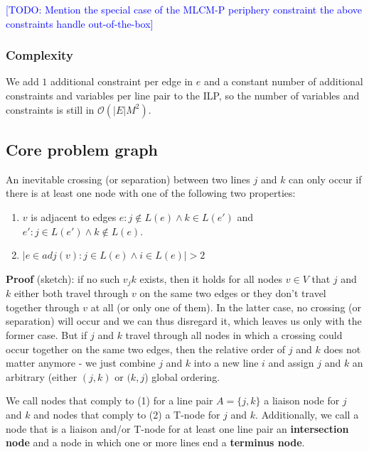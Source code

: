 \documentclass{llncs}
\newcommand\todo[1]{\textcolor{blue}{[TODO: #1]}}
\begin{document}
\todo{Mention the special case of the MLCM-P periphery constraint the above constraints handle out-of-the-box}

\subsubsection{Complexity}
We add $1$ additional constraint per edge in $e$ and a constant number of additional constraints and variables per line pair to the ILP, so the number of variables and constraints is still in $\mathcal{O}(|E|M^2)$.

%
\subsection{Core problem graph}\label{SEC:coreprobgraph}
%
An inevitable crossing (or separation) between two lines $j$ and $k$ can only occur if there is at least one node with one of the following two properties:
\begin{enumerate}
\item $v$ is adjacent to edges $e : j \not\in L(e) \land k \in L(e')$ and $e' : j \in L(e') \land k \not\in L(e)$.
\item $|{e \in adj(v) : j \in L(e) \land i \in L(e)}| > 2$
\end{enumerate}
\textbf{Proof} (sketch): if no such $v_jk$ exists, then it holds for all nodes $v \in V$ that $j$ and $k$ either both travel through $v$ on the same two edges or they don't travel together through $v$ at all (or only one of them). In the latter case, no crossing (or separation) will occur and we can thus disregard it, which leaves us only with the former case. But if $j$ and $k$ travel through all nodes in which a crossing could occur together on the same two edges, then the relative order of $j$ and $k$ does not matter anymore - we just combine $j$ and $k$ into a new line $i$ and assign $j$ and $k$ an arbitrary (either $(j,k)$ or $(k, j$) global ordering.

We call nodes that comply to (1) for a line pair $A = \{j, k\}$ a liaison node for $j$ and $k$ and nodes that comply to (2) a T-node for $j$ and $k$. Additionally, we call a node that is a liaison and/or T-node for at least one line pair an \textbf{intersection node} and a node in which one or more lines end a \textbf{terminus node}.
\end{document}
